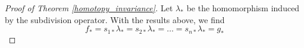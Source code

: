 \documentclass[draft,toc=bib]{scrartcl}
\theoremstyle{plain}
\newtheorem{lemma}[theorem]{Lemma}
\theoremstyle{definition}
\theoremstyle{remark}
\newcommand{\Bd}{\mathrm{Bd}\,}
\newcommand{\Int}{\mathrm{Int}\,}
\begin{document}
\begin{proof}[Proof of Theorem \ref{homotopy_invariance}]
	Let $\lambda_\ast$ be the homomorphism induced by the subdivision operator. With the results above, we find
	\[
	f_\ast=s_{1\ast}\lambda_\ast=s_{2\ast}\lambda_\ast=\dots=s_{n\ast}\lambda_\ast=g_\ast
	\]
\end{proof}

%
%
%	
%	
%	
\end{document}
